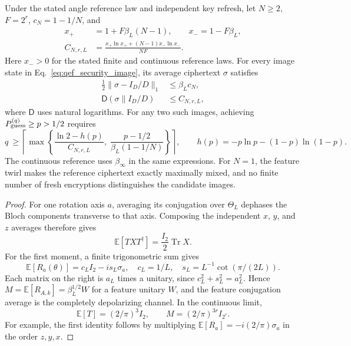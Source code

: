 {\begin{theorem}
\label{thm:qef_moment_sample_bound}
Under the stated angle reference law and independent key refresh, let
$N\geq2$, $F=2^r$, $c_N=1-1/N$, and
\begin{equation}
\label{eq:qef_information_budget}
 \begin{split}
 x_+&=1+F\beta_L(N-1),\qquad x_-=1-F\beta_L,\\
 C_{N,r,L}
 &=\frac{x_+\ln x_+ +(N-1)x_-\ln x_-}{NF}.
 \end{split}
\end{equation}
Here $x_->0$ for the stated finite and continuous reference laws.
For every image state in Eq.~\eqref{eq:qef_security_image}, its average
ciphertext $\sigma$ satisfies
\begin{align}
 \frac12\|\sigma-I_D/D\|_1&\leq\beta_Lc_N,
 \label{eq:qef_one_image_distance}\\
 \mathsf D(\sigma\|I_D/D)&\leq C_{N,r,L},
 \label{eq:qef_cipher_relative_entropy}
\end{align}
where $\mathsf D$ uses natural logarithms. For any two such images,
achieving $P_{\rm guess}^{(q)}\geq p>1/2$ requires
\begin{equation}
\boxed{\displaystyle
 q\ \geq\left\lceil\max\left\{
 \frac{\ln2-h(p)}{C_{N,r,L}},\;
 \frac{p-1/2}{\beta_L(1-1/N)}
 \right\}\right\rceil,}
 \qquad h(p)=-p\ln p-(1-p)\ln(1-p).
\label{eq:qef_final_sample_bound}
\end{equation}
The continuous reference uses $\beta_\infty$ in the same expressions.
For $N=1$, the feature twirl makes the reference ciphertext exactly
maximally mixed, and no finite number of fresh encryptions distinguishes
the candidate images.
\end{theorem}

\begin{proof}
For one rotation axis $a$, averaging its conjugation over $\Theta_L$
dephases the Bloch components transverse to that axis. Composing the
independent $x$, $y$, and $z$ averages therefore gives
\begin{equation}
 \mathbb E[T X T^{\dagger}]=\frac{I_2}{2}\operatorname{Tr}X.
\end{equation}
For the first moment, a finite trigonometric sum gives
\begin{equation}
 \mathbb E[R_a(\theta)]
 =c_LI_2-is_L\sigma_a,
 \quad c_L=1/L,\quad s_L=L^{-1}\cot(\pi/(2L)).
\end{equation}
Each matrix on the right is $a_L$ times a unitary, since
$c_L^2+s_L^2=a_L^2$. Hence
$M=\mathbb E[R_{A,k}]=\beta_L^{1/2}W$ for a feature unitary $W$,
and the feature conjugation average is the completely depolarizing
channel. In the continuous limit,
\begin{equation}
 \mathbb E[T]=(2/\pi)^3 I_2,
 \qquad M=(2/\pi)^{3r}I_{2^r}.
\end{equation}
For example, the first identity follows by multiplying
$\mathbb E[R_a]=-i(2/\pi)\sigma_a$ in the order $z,y,x$.


\end{proof}}

